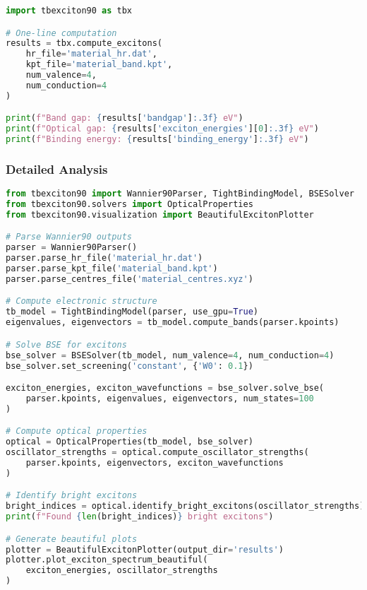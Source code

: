 \documentclass[11pt,a4paper]{article}
\begin{document}
\begin{lstlisting}[language=Python]
import tbexciton90 as tbx

# One-line computation
results = tbx.compute_excitons(
    hr_file='material_hr.dat',
    kpt_file='material_band.kpt',
    num_valence=4,
    num_conduction=4
)

print(f"Band gap: {results['bandgap']:.3f} eV")
print(f"Optical gap: {results['exciton_energies'][0]:.3f} eV")
print(f"Binding energy: {results['binding_energy']:.3f} eV")
\end{lstlisting}

\subsubsection{Detailed Analysis}

\begin{lstlisting}[language=Python]
from tbexciton90 import Wannier90Parser, TightBindingModel, BSESolver
from tbexciton90.solvers import OpticalProperties
from tbexciton90.visualization import BeautifulExcitonPlotter

# Parse Wannier90 outputs
parser = Wannier90Parser()
parser.parse_hr_file('material_hr.dat')
parser.parse_kpt_file('material_band.kpt')
parser.parse_centres_file('material_centres.xyz')

# Compute electronic structure
tb_model = TightBindingModel(parser, use_gpu=True)
eigenvalues, eigenvectors = tb_model.compute_bands(parser.kpoints)

# Solve BSE for excitons
bse_solver = BSESolver(tb_model, num_valence=4, num_conduction=4)
bse_solver.set_screening('constant', {'W0': 0.1})

exciton_energies, exciton_wavefunctions = bse_solver.solve_bse(
    parser.kpoints, eigenvalues, eigenvectors, num_states=100
)

# Compute optical properties
optical = OpticalProperties(tb_model, bse_solver)
oscillator_strengths = optical.compute_oscillator_strengths(
    parser.kpoints, eigenvectors, exciton_wavefunctions
)

# Identify bright excitons
bright_indices = optical.identify_bright_excitons(oscillator_strengths)
print(f"Found {len(bright_indices)} bright excitons")

# Generate beautiful plots
plotter = BeautifulExcitonPlotter(output_dir='results')
plotter.plot_exciton_spectrum_beautiful(
    exciton_energies, oscillator_strengths
)
\end{lstlisting}
\end{document}
